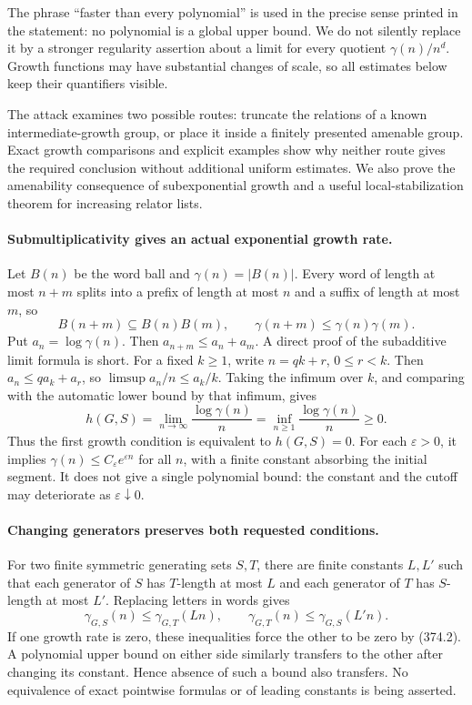 \documentclass[11pt]{article}
\begin{document}
The phrase ``faster than every polynomial'' is used in the precise
sense printed in the statement: no polynomial is a global upper bound.
We do not silently replace it by a stronger regularity assertion about
a limit for every quotient $\gamma(n)/n^d$. Growth functions may have
substantial changes of scale, so all estimates below keep their
quantifiers visible.

The attack examines two possible routes: truncate the relations of a
known intermediate-growth group, or place it inside a finitely presented
amenable group. Exact growth comparisons and explicit examples show
why neither route gives the required conclusion without additional
uniform estimates. We also prove the amenability consequence of
subexponential growth and a useful local-stabilization theorem for
increasing relator lists.

\paragraph{Submultiplicativity gives an actual exponential growth rate.}
Let $B(n)$ be the word ball and $\gamma(n)=|B(n)|$. Every word of
length at most $n+m$ splits into a prefix of length at most $n$ and
a suffix of length at most $m$, so
\[
 B(n+m)\subseteq B(n)B(m),\qquad
 \gamma(n+m)\le\gamma(n)\gamma(m).
 \tag{374.1}
\]
Put $a_n=\log\gamma(n)$. Then $a_{n+m}\le a_n+a_m$.
A direct proof of the subadditive limit formula is short. For a fixed
$k\ge1$, write $n=qk+r$, $0\le r<k$. Then
$a_n\le q a_k+a_r$, so
$\limsup a_n/n\le a_k/k$. Taking the infimum over $k$, and comparing
with the automatic lower bound by that infimum, gives
\[
 h(G,S)=\lim_{n\to\infty}\frac{\log\gamma(n)}n
       =\inf_{n\ge1}\frac{\log\gamma(n)}n\ge0.
 \tag{374.2}
\]
Thus the first growth condition is equivalent to $h(G,S)=0$.
For each $\varepsilon>0$, it implies
$\gamma(n)\le C_\varepsilon e^{\varepsilon n}$ for all $n$, with
a finite constant absorbing the initial segment. It does not give a
single polynomial bound: the constant and the cutoff may deteriorate
as $\varepsilon\downarrow0$.

\paragraph{Changing generators preserves both requested conditions.}
For two finite symmetric generating sets $S,T$, there are finite
constants $L,L'$ such that each generator of $S$ has $T$-length at
most $L$ and each generator of $T$ has $S$-length at most $L'$.
Replacing letters in words gives
\[
 \gamma_{G,S}(n)\le\gamma_{G,T}(Ln),\qquad
 \gamma_{G,T}(n)\le\gamma_{G,S}(L'n).
 \tag{374.3}
\]
If one growth rate is zero, these inequalities force the other to be
zero by (374.2). A polynomial upper bound on either side similarly
transfers to the other after changing its constant. Hence absence of
such a bound also transfers. No equivalence of exact pointwise formulas
or of leading constants is being asserted.
\end{document}
